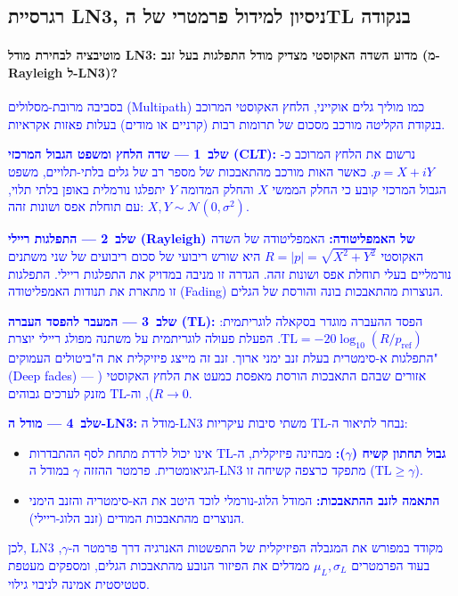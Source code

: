 \documentclass[12pt,a4paper]{article}
\newcommand{\TL}{\mathrm{TL}}
\DeclareRobustCommand{\aiedit}[1]{\textcolor{blue}{#1}}
\begin{document}
\subsection{רגרסיית LN3, ניסיון למידול פרמטרי של הTL בנקודה}
\label{sec:ln3}

\paragraph{מוטיבציה לבחירת מודל LN3: מדוע השדה האקוסטי מצדיק מודל התפלגות בעל זנב (מ-Rayleigh ל-LN3)?}


\aiedit{בסביבה מרובת-מסלולים (\textenglish{Multipath}) כמו מוליך גלים אוקייני, הלחץ האקוסטי
המרוכב בנקודת הקליטה מורכב מסכום של תרומות רבות (קרניים או מודים) בעלות פאזות אקראיות.}

\aiedit{\textbf{שלב~1 --- שדה הלחץ ומשפט הגבול המרכזי (\textenglish{CLT}):}
נרשום את הלחץ המרוכב כ-$p = X + iY$. כאשר האות מורכב מהתאבכות של מספר רב של גלים
בלתי-תלויים, משפט הגבול המרכזי קובע כי החלק הממשי $X$ והחלק המדומה $Y$ יתפלגו נורמלית
באופן בלתי תלוי, עם תוחלת אפס ושונות זהה: $X, Y \sim \mathcal{N}(0, \sigma^2)$.}

\aiedit{\textbf{שלב~2 --- התפלגות ריילי (\textenglish{Rayleigh}) של האמפליטודה:}
האמפליטודה של השדה האקוסטי $R = |p| = \sqrt{X^2 + Y^2}$ היא שורש ריבועי של סכום
ריבועים של שני משתנים נורמליים בעלי תוחלת אפס ושונות זהה. הגדרה זו מניבה במדויק את
התפלגות ריילי. התפלגות זו מתארת את תנודות האמפליטודה (\textenglish{Fading}) הנוצרות
מהתאבכות בונה והורסת של הגלים.}

\aiedit{\textbf{שלב~3 --- המעבר להפסד העברה (\textenglish{TL}):}
הפסד ההעברה מוגדר בסקאלה לוגריתמית: $\TL = -20\log_{10}(R/p_{\text{ref}})$. הפעלת
פעולה לוגריתמית על משתנה מפולג ריילי יוצרת התפלגות א-סימטרית בעלת זנב ימני ארוך.
זנב זה מייצג פיזיקלית את ה"ביטולים העמוקים" (\textenglish{Deep fades}) --- אזורים
שבהם התאבכות הורסת מאפסת כמעט את הלחץ האקוסטי ($R \to 0$), וה-$\TL$ מזנק לערכים גבוהים.}

\aiedit{\textbf{שלב~4 --- מודל ה-\textenglish{LN3}:}
מודל ה-\textenglish{LN3} נבחר לתיאור ה-$\TL$ משתי סיבות עיקריות:}
\begin{itemize}
  \item \aiedit{\textbf{גבול תחתון קשיח ($\gamma$):} מבחינה פיזיקלית, ה-$\TL$ אינו יכול לרדת
        מתחת לסף ההתבדרות הגיאומטרית. פרמטר ההזזה $\gamma$ במודל ה-\textenglish{LN3}
        מתפקד כרצפה קשיחה זו ($\TL \geq \gamma$).}
  \item \aiedit{\textbf{התאמה לזנב ההתאבכות:} המודל הלוג-נורמלי לוכד היטב את הא-סימטריה
        והזנב הימני הנוצרים מהתאבכות המודים (זנב הלוג-ריילי).}
\end{itemize}
\aiedit{לכן, \textenglish{LN3} מקודד במפורש את המגבלה הפיזיקלית של התפשטות האנרגיה דרך פרמטר
ה-$\gamma$, בעוד הפרמטרים $\mu_L, \sigma_L$ ממדלים את הפיזור הנובע מהתאבכות הגלים,
ומספקים מעטפת סטטיסטית אמינה לניבוי גילוי.}
\end{document}
